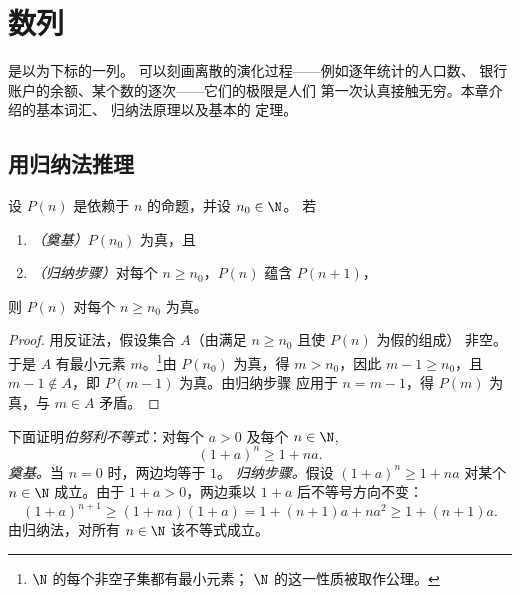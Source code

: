 \chapter{数列}\label{ch:g12:seq}

是以为下标的一列。
可以刻画离散的演化过程——例如逐年统计的人口数、
银行账户的余额、某个数的逐次——它们的极限是人们
第一次认真接触无穷。本章介绍的基本词汇、
归纳法原理以及基本的
定理。

\section{用归纳法推理}

\begin{theorem}[归纳法原理]\label{thm:g12:seq:induction}
设 $P(n)$ 是依赖于 $n$ 的命题，并设 $n_0 \in \N$。
若
\begin{enumerate}
  \item \emph{（奠基）}$P(n_0)$ 为真，且
  \item \emph{（归纳步骤）}对每个 $n \geq n_0$，$P(n)$ 蕴含 $P(n+1)$，
\end{enumerate}
则 $P(n)$ 对每个 $n \geq n_0$ 为真。
\end{theorem}

\begin{proof}
用反证法，假设集合 $A$（由满足 $n \geq n_0$ 且使 $P(n)$ 为假的组成）
非空。于是 $A$ 有最小元素
$m$。\footnote{$\N$ 的每个非空子集都有最小元素；
$\N$ 的这一性质被取作公理。}由 $P(n_0)$ 为真，得 $m > n_0$，因此
$m - 1 \geq n_0$，且 $m-1 \notin A$，即 $P(m-1)$ 为真。由归纳步骤
应用于 $n = m-1$，得 $P(m)$ 为真，与
$m \in A$ 矛盾。
\end{proof}

\begin{example}\label{ex:g12:seq:bernoulli}
下面证明\emph{伯努利不等式}：对每个 $a > 0$ 及每个
$n \in \N$,
\[
(1+a)^n \geq 1 + na.
\]
\emph{奠基。}当 $n = 0$ 时，两边均等于 $1$。
\emph{归纳步骤。}假设 $(1+a)^n \geq 1+na$ 对某个 $n \in \N$ 成立。由于
$1 + a > 0$，两边乘以 $1+a$ 后不等号方向不变：
\[
(1+a)^{n+1} \geq (1+na)(1+a) = 1 + (n+1)a + na^2 \geq 1 + (n+1)a .
\]
由归纳法，对所有 $n \in \N$ 该不等式成立。
\end{example}

